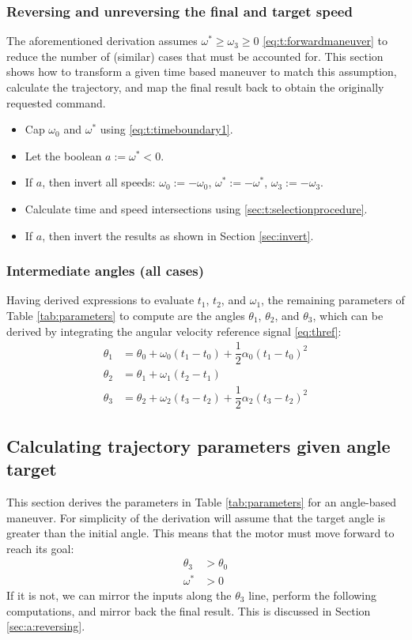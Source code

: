 \documentclass[12pt, a4paper]
{article}
\providecommand{\w}{\omega}
\providecommand{\wt}{\w^*}
\renewcommand{\th}{\theta}
\renewcommand{\a}{\alpha}
\begin{document}
\subsubsection{Reversing and unreversing the final and target speed}

\label{sec:t:reversing}
The aforementioned derivation assumes $\wt \geq \w_3 \geq 0$
\eqref{eq:t:forwardmaneuver} to reduce the number of (similar) cases that must
be accounted for. This section shows how to transform a given time based
maneuver to match this assumption, calculate the trajectory, and map the final
result back to obtain the originally requested command.

\begin{itemize}
    \item Cap $\w_0$ and $\wt$ using \eqref{eq:t:timeboundary1}.
    \item Let the boolean $a := \wt < 0$.
    \item If $a$, then invert all speeds: $\w_0 := -\w_0$, $\wt := -\wt$,
        $\w_3 := -\w_3$.
    \item Calculate time and speed intersections using
    \eqref{sec:t:selectionprocedure}.
    \item If $a$, then invert the results as shown in Section \ref{sec:invert}.
\end{itemize}


\subsubsection{Intermediate angles (all cases)}

Having derived expressions to evaluate $t_1$, $t_2$, and $\w_1$, the remaining
parameters of Table \ref{tab:parameters} to compute are the angles
$\th_1$, $\th_2$, and $\th_3$, which can be derived by integrating the
angular velocity reference signal \eqref{eq:thref}:
\begin{align}
    \label{eq:t:anglepar1}
    \th_1  &= \th_0  + \w_0(t_1-t_0)+\dfrac{1}{2}\a_0(t_1-t_0)^2\\
    \label{eq:t:anglepar2}
    \th_2&=\th_1+ \w_1(t_2-t_1)\\
    \label{eq:t:anglepar3}
    \th_3  &=\th_2+ \w_2(t_3-t_2)+\dfrac{1}{2}\a_2(t_3-t_2)^2    
\end{align}
%

\subsection{Calculating trajectory parameters given angle target}
\label{sec:anglebasedref}
This section derives the parameters in Table \ref{tab:parameters} for an
angle-based maneuver. For simplicity of the derivation will assume that
the target angle  is greater than the initial angle. This
means that the motor must move forward to reach its goal:
%
\begin{align}
    \label{eq:a:forwardmaneuver}
    \th_3 &> \th_0\\
    \wt &> 0
\end{align}
%
If it is not, we can mirror the inputs along the $\th_3$ line, perform the
following computations, and mirror back the final result. This is discussed
in Section \ref{sec:a:reversing}.
\end{document}
